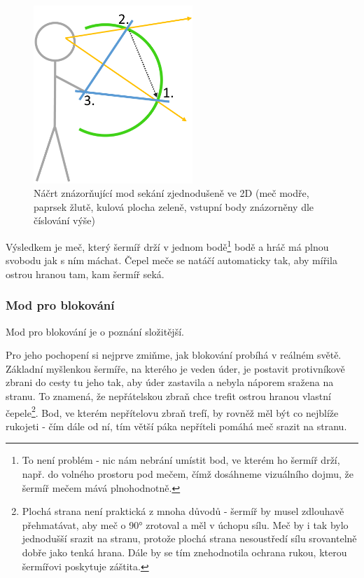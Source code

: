 \begin{figure}[ht]\centering
    \center
    \includegraphics[width=60mm]{../img/diagram-slashingMode.png}
    \caption{Náčrt znázorňující mod sekání zjednodušeně ve 2D (meč modře, paprsek žlutě, kulová plocha zeleně, vstupní body znázorněny dle číslování výše)}
    \label{obr04:swordSlashingMode2D}
\end{figure} 
 
Výsledkem je meč, který šermíř drží v jednom bodě\footnote{To není problém - nic nám nebrání umístit bod, ve kterém ho šermíř drží, např. do volného prostoru pod mečem, čímž dosáhneme vizuálního dojmu, že šermíř mečem mává plnohodnotně.} bodě a hráč má plnou svobodu jak s ním máchat. Čepel meče se natáčí automaticky tak, aby mířila ostrou hranou tam, kam šermíř seká.

\subsubsection*{Mod pro blokování}

Mod pro blokování je o poznání složitější.

Pro jeho pochopení si nejprve zmiňme, jak blokování probíhá v reálném světě. Základní myšlenkou šermíře, na kterého je veden úder, je postavit protivníkově zbrani do cesty tu jeho tak, aby úder zastavila a nebyla náporem sražena na stranu. To znamená, že nepřátelskou zbraň chce trefit ostrou hranou vlastní čepele\footnote{Plochá strana není praktická z mnoha důvodů - šermíř by musel zdlouhavě přehmatávat, aby meč o 90° zrotoval a měl v úchopu sílu. Meč by i tak bylo jednodušší srazit na stranu, protože plochá strana nesoustředí sílu srovantelně dobře jako tenká hrana. Dále by se tím znehodnotila ochrana rukou, kterou šermířovi poskytuje záštita.}. Bod, ve kterém nepřítelovu zbraň trefí, by rovněž měl být co nejblíže rukojeti - čím dále od ní, tím větší páka nepříteli pomáhá meč srazit na stranu.

